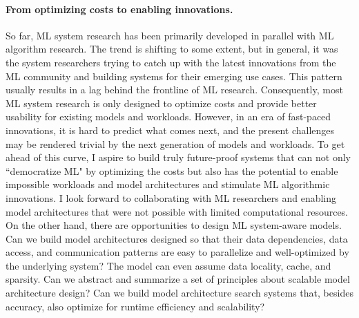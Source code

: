 \documentclass[letterpaper]{article}
\begin{document}
\paragraph{From optimizing costs to enabling innovations.}So far, ML system research has been primarily developed in parallel with ML algorithm research. The trend is shifting to some extent, but in general, it was the system researchers trying to catch up with the latest innovations from the ML community and building systems for their emerging use cases. This pattern usually results in a lag behind the frontline of ML research. Consequently, most ML system research is only designed to optimize costs and provide better usability for existing models and workloads. However, in an era of fast-paced innovations, it is hard to predict what comes next, and the present challenges may be rendered trivial by the next generation of models and workloads. To get ahead of this curve, I aspire to build truly future-proof systems that can not only ``democratize ML" by optimizing the costs but also has the potential to enable impossible workloads and model architectures and stimulate ML algorithmic innovations. I look forward to collaborating with ML researchers and enabling model architectures that were not possible with limited computational resources.
On the other hand, there are opportunities to design ML system-aware models. Can we build model architectures designed so that their data dependencies, data access, and communication patterns are easy to parallelize and well-optimized by the underlying system? The model can even assume data locality, cache, and sparsity. Can we abstract and summarize a set of principles about scalable model architecture design? Can we build model architecture search systems that, besides accuracy, also optimize for runtime efficiency and scalability?










\end{document}
